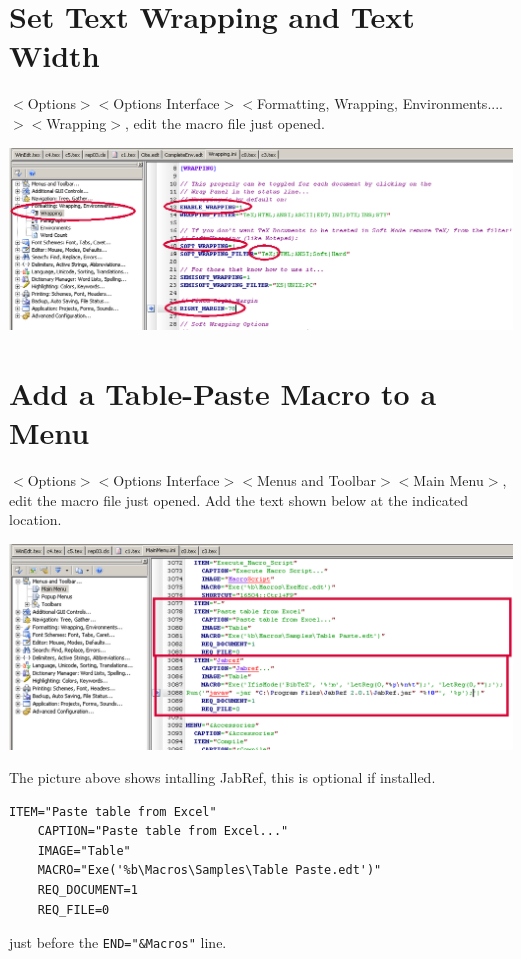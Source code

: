 \section{Set Text Wrapping and Text Width}

$<$Options$>$$<$Options Interface$>$$<$Formatting, Wrapping, Environments....$>$$<$Wrapping$>$, edit the macro file just opened.

\centerline{\includegraphics[bb= 0 0 1093 397,width=\textwidth]{eps/wrapping.png}}

\section{Add a Table-Paste Macro to a Menu}
\label{sec:addpastetable}

$<$Options$>$$<$Options Interface$>$$<$Menus and Toolbar$>$$<$Main Menu$>$, edit the macro file just opened. Add the text shown below at the indicated location.

\centerline{\includegraphics[bb= 0 0 1055 431,width=\textwidth]{eps/AddExcelTable.png}}


The picture above shows intalling JabRef, this is optional if installed.

\begin{lstlisting}[label=MacropastetableExcel,caption=Macro to paste table from Excel]
    ITEM="Paste table from Excel"
    CAPTION="Paste table from Excel..."
    IMAGE="Table"
    MACRO="Exe('%b\Macros\Samples\Table Paste.edt')"
    REQ_DOCUMENT=1
    REQ_FILE=0
\end{lstlisting}
just before the \lstinline{END="&Macros"} line.


